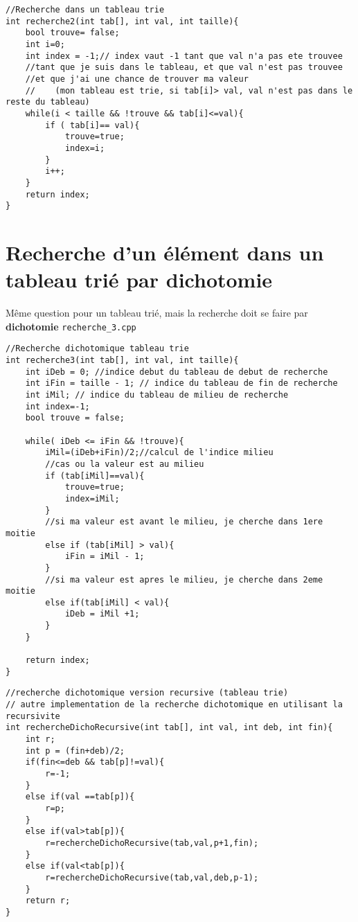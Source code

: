 \documentclass[french]{article}
\begin{document}
		\begin{lstlisting}[caption={Recherche dans un tableau trie}]
//Recherche dans un tableau trie
int recherche2(int tab[], int val, int taille){
    bool trouve= false;
    int i=0;
    int index = -1;// index vaut -1 tant que val n'a pas ete trouvee
    //tant que je suis dans le tableau, et que val n'est pas trouvee
    //et que j'ai une chance de trouver ma valeur
    //    (mon tableau est trie, si tab[i]> val, val n'est pas dans le reste du tableau)
    while(i < taille && !trouve && tab[i]<=val){
        if ( tab[i]== val){
            trouve=true;
            index=i;
        }
        i++;
    }
    return index;
}
	\end{lstlisting}
	
	\section{Recherche d'un élément dans un tableau trié par dichotomie}
	Même question pour un tableau trié, mais la recherche doit se faire par \textbf{dichotomie} \texttt{recherche\_3.cpp}
	
	
		\begin{lstlisting}[caption={Recherche dichotomique tableau trie}]
//Recherche dichotomique tableau trie
int recherche3(int tab[], int val, int taille){
    int iDeb = 0; //indice debut du tableau de debut de recherche
    int iFin = taille - 1; // indice du tableau de fin de recherche
    int iMil; // indice du tableau de milieu de recherche
    int index=-1;
    bool trouve = false;
    
    while( iDeb <= iFin && !trouve){
        iMil=(iDeb+iFin)/2;//calcul de l'indice milieu
        //cas ou la valeur est au milieu
        if (tab[iMil]==val){
            trouve=true;
            index=iMil;
        }
        //si ma valeur est avant le milieu, je cherche dans 1ere moitie
        else if (tab[iMil] > val){
            iFin = iMil - 1;
        }
        //si ma valeur est apres le milieu, je cherche dans 2eme moitie
        else if(tab[iMil] < val){
            iDeb = iMil +1;
        }
    }
    
    return index;
}

	\end{lstlisting}
	
			\begin{lstlisting}[caption={Recherche dichotomique récursive dans tableau trie}]
//recherche dichotomique version recursive (tableau trie)
// autre implementation de la recherche dichotomique en utilisant la recursivite
int rechercheDichoRecursive(int tab[], int val, int deb, int fin){
    int r;
    int p = (fin+deb)/2;
    if(fin<=deb && tab[p]!=val){
        r=-1;
    }
    else if(val ==tab[p]){
        r=p;
    }
    else if(val>tab[p]){
        r=rechercheDichoRecursive(tab,val,p+1,fin);
    }
    else if(val<tab[p]){
        r=rechercheDichoRecursive(tab,val,deb,p-1);
    }
    return r;
}
	\end{lstlisting}
\end{document}
